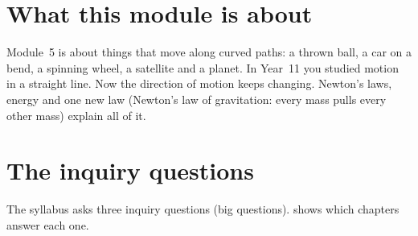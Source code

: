 \makecover
{}
\tableofcontents


\newcommand\ovYes{\textcolor{hscformula}{\faCheck}}
\newcommand\ovNo{\textcolor{hscmistake}{\faTimes}}
\newcommand\ovComb{\textcolor{hsctiptext}{\faLink}}
\newcommand\ovrow[3]{#1 & #2 & {\footnotesize #3}\\\hline}
\newcommand\ovch[2]{\multicolumn{3}{@{}l@{}}{\rule{0pt}{3.4ex}\cref{#1}:
  {\bfseries\color{hscbrand}#2}}\\\hline}
\newenvironment{ovgrid}{%
  \small\renewcommand\arraystretch{1.32}\arrayrulecolor{hscrule}%
  \begin{tabular}[t]{@{}C{4.5mm}@{\hspace{1.5mm}}L{37mm}@{\hspace{1.5mm}}L{\dimexpr\linewidth-44.5mm\relax}@{}}}%
  {\end{tabular}}

\section*{What this module is about}

Module~5 is about things that move along curved paths: a thrown ball, a car on a bend, a
spinning wheel, a satellite and a planet. In Year~11 you studied motion in a straight line.
Now the direction of motion keeps changing. Newton's laws, energy and one new law (Newton's
law of gravitation: every mass pulls every other mass) explain all of it.

\section*{The inquiry questions}

The syllabus asks three inquiry questions (big questions).  shows which
chapters answer each one.

